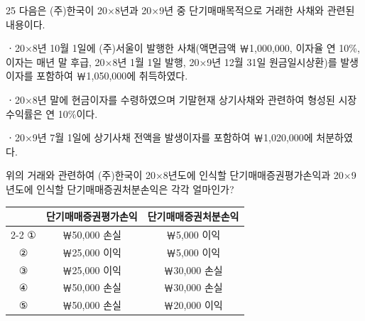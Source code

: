\begin{question}{25}
다음은 (주)한국이 20×8년과 20×9년 중 단기매매목적으로 거래한 사채와 관련된 내용이다.
\begin{framedtext}
ㆍ20×8년 10월 1일에 (주)서울이 발행한 사채(액면금액 ￦1,000,000, 이자율 연 10\%, 이자는 매년 말 후급, 20×8년 1월 1일 발행, 20×9년 12월 31일 원금일시상환)를 발생이자를 포함하여 ￦1,050,000에 취득하였다. \par
ㆍ20×8년 말에 현금이자를 수령하였으며 기말현재 상기사채와 관련하여 형성된 시장수익률은 연 10\%이다. \par
ㆍ20×9년 7월 1일에 상기사채 전액을 발생이자를 포함하여 ￦1,020,000에 처분하였다. \par
\end{framedtext}
위의 거래와 관련하여 (주)한국이 20×8년도에 인식할 단기매매증권평가손익과 20×9년도에 인식할 단기매매증권처분손익은 각각 얼마인가? \par

{\small\centering
\begin{tabular}{@{}ccc@{}}
 & 단기매매증권평가손익 & 단기매매증권처분손익 \\
\cline{2-2}\cline{3-3}
① & ￦50,000 손실 & ￦5,000 이익 \\
② & ￦25,000 이익 & ￦5,000 이익 \\
③ & ￦25,000 이익 & ￦30,000 손실 \\
④ & ￦50,000 손실 & ￦30,000 손실 \\
⑤ & ￦50,000 손실 & ￦20,000 이익 \\
\end{tabular}\par}
\end{question}
